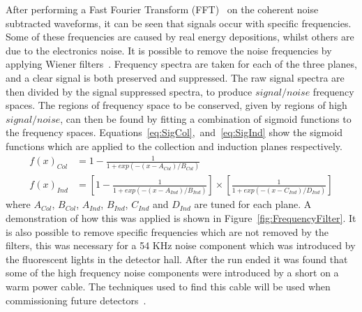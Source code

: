 After performing a Fast Fourier Transform (FFT)~\citep{CoTuFFT} on the coherent noise subtracted waveforms, it can be seen that signals occur with specific frequencies. Some of these frequencies are caused by real energy depositions, whilst others are due to the electronics noise. It is possible to remove the noise frequencies by applying Wiener filters~\citep{WienerFilter}. Frequency spectra are taken for each of the three planes, and a clear signal is both preserved and suppressed. The raw signal spectra are then divided by the signal suppressed spectra, to produce $signal/noise$ frequency spaces. The regions of frequency space to be conserved, given by regions of high $signal/noise$, can then be found by fitting a combination of sigmoid functions to the frequency spaces. Equations~\ref{eq:SigCol},~and~\ref{eq:SigInd} show the sigmoid functions which are applied to the collection and induction planes respectively.  
\begin{align}
  f(x)_{Col} &= 1 - \frac{1}{1 + exp( -(x - A_{Col})/B_{Col} ) } \label{eq:SigCol} \\
  f(x)_{Ind} &= \left[ 1 - \frac{1}{1 + exp( -(x - A_{Ind})/B_{Ind} ) } \right] \times \left[ \frac{1}{1 + exp( -(x - C_{Ind})/D_{Ind} ) } \right] \label{eq:SigInd}
\end{align}
where $A_{Col}$, $B_{Col}$, $A_{Ind}$, $B_{Ind}$, $C_{Ind}$ and $D_{Ind}$ are tuned for each plane. A demonstration of how this was applied is shown in Figure~\ref{fig:FrequencyFilter}. It is also possible to remove specific frequencies which are not removed by the filters, this was necessary for a 54 KHz noise component which was introduced by the fluorescent lights in the detector hall. After the run ended it was found that some of the high frequency noise components were introduced by a short on a warm power cable. The techniques used to find this cable will be used when commissioning future detectors~\citep{35tonNoiseMeeting}. \\


